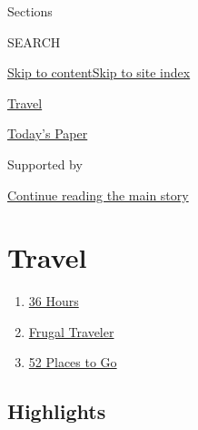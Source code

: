 Sections

SEARCH

\protect\hyperlink{site-content}{Skip to
content}\protect\hyperlink{site-index}{Skip to site index}

\href{https://www.nytimes.com/section/travel}{Travel}

\href{https://myaccount.nytimes.com/auth/login?response_type=cookie\&client_id=vi}{}

\href{https://www.nytimes.com/section/todayspaper}{Today's Paper}

Supported by

\protect\hyperlink{after-sponsor}{Continue reading the main story}

\hypertarget{travel}{%
\section{Travel}\label{travel}}

\begin{enumerate}
\def\labelenumi{\arabic{enumi}.}
\tightlist
\item
  \href{/column/36-hours}{36 Hours}
\item
  \href{/column/frugal-traveler}{Frugal Traveler}
\item
  \href{/interactive/2020/travel/places-to-visit.html}{52 Places to Go}
\end{enumerate}

\hypertarget{highlights}{%
\subsection{Highlights}\label{highlights}}

